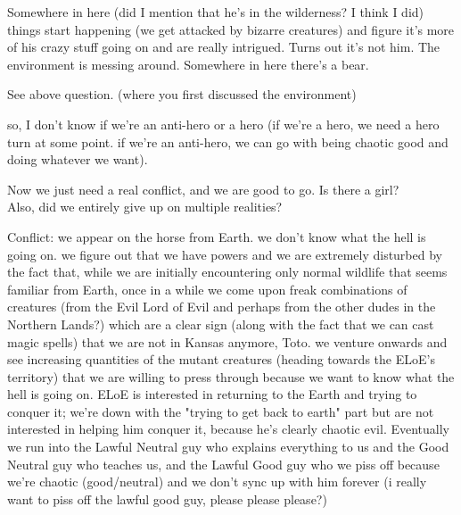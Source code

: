 Somewhere in here (did I mention that he's in the wilderness? I think I did) things start happening (we get attacked by bizarre creatures) and figure it's more of his crazy stuff going on and are really intrigued. Turns out it's not him. The environment is messing around. Somewhere in here there's a bear.

\A See above question. (where you first discussed the environment)

\R so, I don't know if we're an anti-hero or a hero (if we're a hero, we need a hero turn at some point. if we're an anti-hero, we can go with being chaotic good and doing whatever we want).  

\A Now we just need a real conflict, and we are good to go. Is there a girl? \\
Also, did we entirely give up on multiple realities?

\R Conflict: we appear on the horse from Earth. we don't know what the hell is going on. we figure out that we have powers and we are extremely disturbed by the fact that, while we are initially encountering only normal wildlife that seems familiar from Earth, once in a while we come upon freak combinations of creatures (from the Evil Lord of Evil and perhaps from the other dudes in the Northern Lands?) which are a clear sign (along with the fact that we can cast magic spells) that we are not in Kansas anymore, Toto.  we venture onwards and see increasing quantities of the mutant creatures (heading towards the ELoE's territory) that we are willing to press through because we want to know what the hell is going on. ELoE is interested in returning to the Earth and trying to conquer it; we're down with the "trying to get back to earth" part but are not interested in helping him conquer it, because he's clearly chaotic evil. Eventually we run into the Lawful Neutral guy who explains everything to us and the Good Neutral guy who teaches us, and the Lawful Good guy who we piss off because we're chaotic (good/neutral) and we don't sync up with him forever (i really want to piss off the lawful good guy, please please please?)

